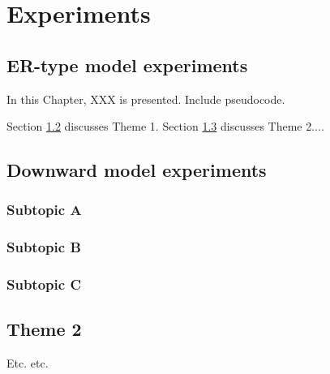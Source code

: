 
\chapter{Experiments}\label{chap:contrib2}

\section{ER-type model experiments}

In this Chapter, XXX is presented. Include pseudocode. 

Section \ref{sec:contrib2:theme1} discusses Theme 1. Section \ref{sec:contrib2:theme2} discusses Theme 2....

\section{Downward model experiments}\label{sec:contrib2:theme1}

\subsection{Subtopic A}\label{sec:contrib2:theme1:A}

\subsection{Subtopic B}\label{sec:contrib2:theme1:B}

\subsection{Subtopic C}\label{sec:contrib2:theme1:C}

\section{Theme 2}\label{sec:contrib2:theme2}

Etc. etc.

